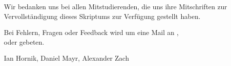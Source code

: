 
Wir bedanken uns bei allen Mitstudierenden, die uns ihre Mitschriften zur Vervollständigung dieses Skriptums zur Verfügung gestellt haben.

Bei Fehlern, Fragen oder Feedback wird um eine Mail an , \\  oder  gebeten.

\begin{flushright}
    Ian Hornik, Daniel Mayr, Alexander Zach
\end{flushright}